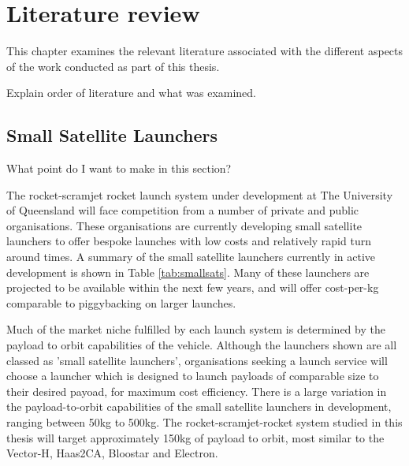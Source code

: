 
\cleardoublepage
\chapter{Literature review}\label{chapter:literature-review}

  This chapter examines the relevant literature associated with the different aspects of the work conducted as part of this thesis. 
  
 
  Explain order of literature and what was examined.
  
  
  
  
  \section{Small Satellite Launchers}
  
  What point do I want to make in this section?
  
  The rocket-scramjet rocket launch system under development at The University of Queensland will face competition from a number of private and public organisations.  
  These organisations are currently developing small satellite launchers to offer bespoke launches with low costs and relatively rapid turn around times. A summary of the small satellite launchers currently in active development is shown in Table \ref{tab:smallsats}. Many of these launchers are projected to be available within the next few years, and will offer cost-per-kg comparable to piggybacking on larger launches. 
  
  Much of the market niche fulfilled by each launch system is determined by the payload to orbit capabilities of the vehicle. Although the launchers shown are all classed as 'small satellite launchers', organisations seeking a launch service will choose a launcher which is designed to launch payloads of comparable size to their desired payoad, for maximum cost efficiency. There is a large variation in the payload-to-orbit capabilities of the small satellite launchers in development, ranging between 50kg to 500kg. The rocket-scramjet-rocket system studied in this thesis will target approximately 150kg of payload to orbit, most similar to the Vector-H\cite{Vector}, Haas2CA\cite{ARCA}, Bloostar\cite{Bloostar}  and Electron\cite{Electron}. 
  
